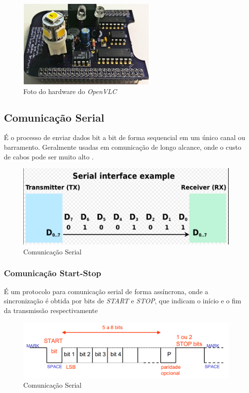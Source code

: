 \begin{figure}[!htbp]
    \caption{Foto do hardware do \textit{OpenVLC}} \label{fig_minipage_imagem1}
    \includegraphics[scale=0.9]{images/Cape.png}
\end{figure}

\subsection{Comunicação Serial}

É o processo de enviar dados bit a bit de forma sequencial em um único canal ou barramento. Geralmente usadas em comunicação de longo alcance, onde o custo de cabos pode ser muito alto \cite{wikipedia2023}.

\begin{figure}[!htbp]
    \caption{Comunicação Serial} \label{comunicacao_serial}
    \includegraphics[scale=0.4]{images/comunicacao_serial.png}
\end{figure}

\subsubsection{Comunicação Start-Stop}

É um protocolo para comunicação serial de forma assíncrona, onde a sincronização é obtida por bits de \emph{START} e \emph{STOP}, que indicam o início e o fim da transmissão respectivamente \cite{comunicaoSerial}

\begin{figure}[!htbp]
    \caption{Comunicação Serial} \label{proto_start_stop}
    \includegraphics[scale=0.5]{images/proto_start_stop.png}
\end{figure}

